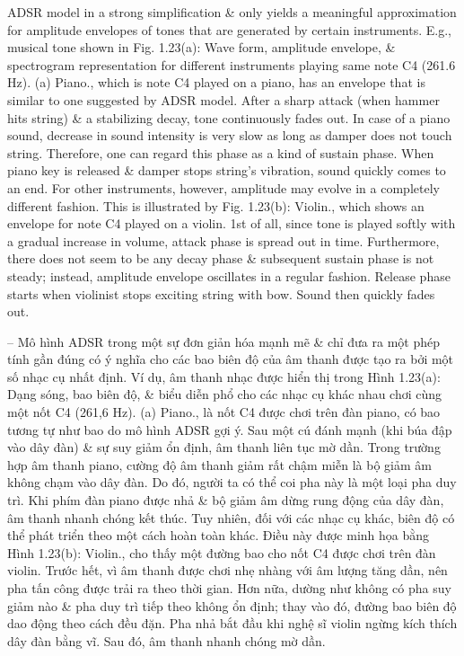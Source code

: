 \documentclass{article}
\begin{document}
\begin{itemize}
\begin{itemize}
\begin{itemize}
			ADSR model in a strong simplification \& only yields a meaningful approximation for amplitude envelopes of tones that are generated by certain instruments. E.g., musical tone shown in {\sf Fig. 1.23(a): Wave form, amplitude envelope, \& spectrogram representation for different instruments playing same note C4 (261.6 Hz). (a) Piano.}, which is note C4 played on a piano, has an envelope that is similar to one suggested by ADSR model. After a sharp attack (when hammer hits string) \& a stabilizing decay, tone continuously fades out. In case of a piano sound, decrease in sound intensity is very slow as long as damper does not touch string. Therefore, one can regard this phase as a kind of sustain phase. When piano key is released \& damper stops string's vibration, sound quickly comes to an end. For other instruments, however, amplitude may evolve in a completely different fashion. This is illustrated by {\sf Fig. 1.23(b): Violin.}, which shows an envelope for note C4 played on a violin. 1st of all, since tone is played softly with a gradual increase in volume, attack phase is spread out in time. Furthermore, there does not seem to be any decay phase \& subsequent sustain phase is not steady; instead, amplitude envelope oscillates in a regular fashion. Release phase starts when violinist stops exciting string with bow. Sound then quickly fades out.
			
			-- Mô hình ADSR trong một sự đơn giản hóa mạnh mẽ \& chỉ đưa ra một phép tính gần đúng có ý nghĩa cho các bao biên độ của âm thanh được tạo ra bởi một số nhạc cụ nhất định. Ví dụ, âm thanh nhạc được hiển thị trong {\sf Hình 1.23(a): Dạng sóng, bao biên độ, \& biểu diễn phổ cho các nhạc cụ khác nhau chơi cùng một nốt C4 (261,6 Hz). (a) Piano.}, là nốt C4 được chơi trên đàn piano, có bao tương tự như bao do mô hình ADSR gợi ý. Sau một cú đánh mạnh (khi búa đập vào dây đàn) \& sự suy giảm ổn định, âm thanh liên tục mờ dần. Trong trường hợp âm thanh piano, cường độ âm thanh giảm rất chậm miễn là bộ giảm âm không chạm vào dây đàn. Do đó, người ta có thể coi pha này là một loại pha duy trì. Khi phím đàn piano được nhả \& bộ giảm âm dừng rung động của dây đàn, âm thanh nhanh chóng kết thúc. Tuy nhiên, đối với các nhạc cụ khác, biên độ có thể phát triển theo một cách hoàn toàn khác. Điều này được minh họa bằng {\sf Hình 1.23(b): Violin.}, cho thấy một đường bao cho nốt C4 được chơi trên đàn violin. Trước hết, vì âm thanh được chơi nhẹ nhàng với âm lượng tăng dần, nên pha tấn công được trải ra theo thời gian. Hơn nữa, dường như không có pha suy giảm nào \& pha duy trì tiếp theo không ổn định; thay vào đó, đường bao biên độ dao động theo cách đều đặn. Pha nhả bắt đầu khi nghệ sĩ violin ngừng kích thích dây đàn bằng vĩ. Sau đó, âm thanh nhanh chóng mờ dần.
			

\end{itemize}
\end{itemize}
\end{itemize}
\end{document}
